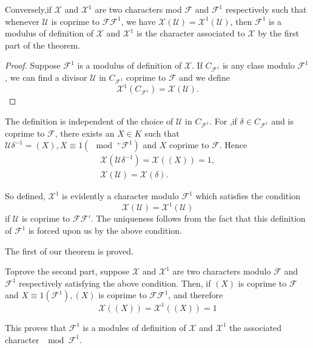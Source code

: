 Conversely,\pageoriginale if $\mathcal{X}$ and $\mathcal{X}^1$ are two characters mod
$\mathcal{F}$ and $\mathcal{F}^1$ respectively such that whenever
$\mathscr{U}$ is coprime to $\mathcal{F} \mathcal{F}^1$, we have
$\mathcal{X} (\mathscr{U}) =\mathcal{X}^1 (\mathscr{U})$, then
$\mathcal{F^1}$ is a modulus of definition of $\mathcal{X}$ and
$\mathcal{X}^1$ is the character associated to $\mathcal{X}$ by the
first part of the theorem. 

\begin{proof}
  Suppose $\mathcal{F}^1$ is a modulus of definition of
  $\mathcal{X}$. If $C _{\mathcal{F}^1}$ is any  class modulo
  $\mathcal{F}^1$, we can find a divisor $\mathscr{U}$ in
  $C_{\mathcal{F}^1}$ coprime to $\mathcal{F}$ and we define  
  $$
  \mathcal{X}^1 (C_{\mathcal{F}^1}) = \mathcal{X}  (\mathscr{U}) .
  $$  
\end{proof}

The definition is independent of the choice of $\mathscr{U}$ in
$C_{\mathcal{F}^1}$. For ,if  $\delta \in C_{\mathcal{F}^1}$ and is
coprime to $\mathcal{F}$, there  exists an $X \in K$ such that
$\mathscr{U} \delta^{-1}= (X), X \equiv 1 (\mod^+ \mathcal{F}^1)$ and
$X$ coprime to $\mathcal{F}$. Hence  
\begin{gather*}
  \mathcal{X} (\mathscr{U}\delta^{-1}) = \mathcal{X} ((X)) =1 , \\
  \mathcal{X} (\mathscr{U})  = \mathcal{X} (\delta ).
\end{gather*}

So defined, $\mathcal{X} ^1$ is evidently a character modulo
$\mathcal{F}^1$ which satisfies the condition  
$$
\mathcal{X} (\mathscr{U}) = \mathcal{X}^1(\mathscr{U})
$$
if $\mathscr{U}$ is coprime to $\mathcal{F} \mathcal{F'}$. The
uniqueness follows from the  fact that  this definition of
$\mathcal{F}^1$ is forced upon us by the above condition.  

The first  of our  theorem is proved. 

To\pageoriginale prove the second part, suppose $\mathcal{X}$ and $\mathcal{X}^1$ are
two characters modulo $\mathcal{F}$ and $\mathcal{F}^1$ respectively
satisfying the above condition. Then, if $(X)$ is coprime to
$\mathcal{F}$ and $X \equiv 1 (\mathcal{F}^1), (X) $ is coprime to
$\mathcal{F} \mathcal{F}^1$, and therefore 
$$
\mathcal{X} ((X)) = \mathcal{X}^1 ((X)) = 1
$$

This proves that $\mathcal{F}^1$ is a modules of definition of
$\mathcal{X}$ and $\mathcal{X}^1$ the associated character $\mod
\mathcal{F}^1$. 

